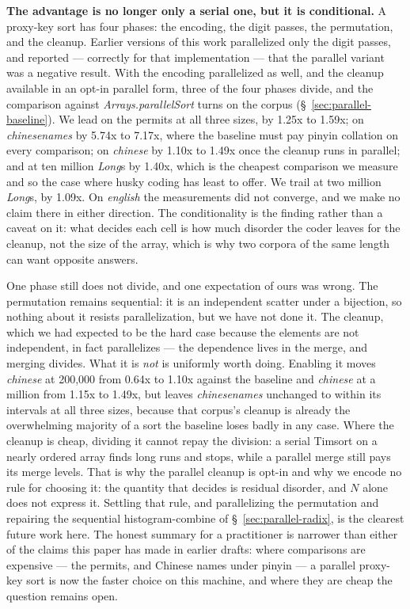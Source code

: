 \documentclass[twoside,leqno,twocolumn]{article}
\begin{document}
\textbf{The advantage is no longer only a serial one, but it is conditional.}
A proxy-key sort has four phases: the encoding, the digit passes, the permutation, and the cleanup.
Earlier versions of this work parallelized only the digit passes, and reported --- correctly for that
implementation --- that the parallel variant was a negative result.
With the encoding parallelized as well, and the cleanup available in an opt-in parallel form, three of
the four phases divide, and the comparison against \mbox{\textit{Arrays.parallelSort}} turns on the
corpus (\S~\ref{sec:parallel-baseline}).
We lead on the permits at all three sizes, by 1.25x to 1.59x; on \textit{chinesenames} by 5.74x to
7.17x, where the baseline must pay pinyin collation on every comparison; on \textit{chinese} by 1.10x
to 1.49x once the cleanup runs in parallel; and at ten million \textit{Long}s by 1.40x, which is the
cheapest comparison we measure and so the case where husky coding has least to offer.
We trail at two million \textit{Long}s, by 1.09x.
On \textit{english} the measurements did not converge, and we make no claim there in either direction.
The conditionality is the finding rather than a caveat on it: what decides each cell is how much
disorder the coder leaves for the cleanup, not the size of the array, which is why two corpora of the
same length can want opposite answers.

One phase still does not divide, and one expectation of ours was wrong.
The permutation remains sequential: it is an independent scatter under a bijection, so nothing about
it resists parallelization, but we have not done it.
The cleanup, which we had expected to be the hard case because the elements are not independent, in
fact parallelizes --- the dependence lives in the merge, and merging divides.
What it is \emph{not} is uniformly worth doing.
Enabling it moves \textit{chinese} at 200,000 from 0.64x to 1.10x against the baseline and
\textit{chinese} at a million from 1.15x to 1.49x, but leaves \textit{chinesenames} unchanged to within
its intervals at all three sizes, because that corpus's cleanup is already the overwhelming majority of
a sort the baseline loses badly in any case.
Where the cleanup is cheap, dividing it cannot repay the division: a serial Timsort on a nearly ordered
array finds long runs and stops, while a parallel merge still pays its merge levels.
That is why the parallel cleanup is opt-in and why we encode no rule for choosing it: the quantity that
decides is residual disorder, and $N$ alone does not express it.
Settling that rule, and parallelizing the permutation and repairing the sequential histogram-combine of
\S~\ref{sec:parallel-radix}, is the clearest future work here.
The honest summary for a practitioner is narrower than either of the claims this paper has made in
earlier drafts: where comparisons are expensive --- the permits, and Chinese names under pinyin --- a
parallel proxy-key sort is now the faster choice on this machine, and where they are cheap the question
remains open.
\end{document}

